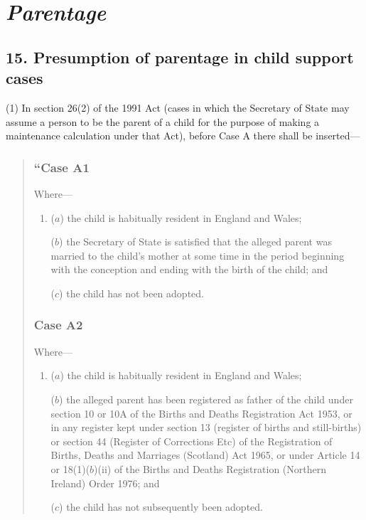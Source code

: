 \documentclass[12pt,a4paper]{article}
\begin{document}
\section{\itshape Parentage}

\subsection{15. Presumption of parentage in child support cases}

(1) In section 26(2)  of the 1991 Act (cases in which the Secretary of State may assume a person to be the parent of a child for the purpose of making a maintenance calculation under that Act), before Case A there shall be inserted—
\begin{quotation}
\subsubsection*{“Case A1}

Where—
\begin{enumerate}\item[]
($a$) the child is habitually resident in England and Wales;

($b$) the Secretary of State is satisfied that the alleged parent was married to the child’s mother at some time in the period beginning with the conception and ending with the birth of the child; and

($c$) the child has not been adopted.
\end{enumerate}

\subsubsection*{Case A2}

Where—
\begin{enumerate}\item[]
($a$) the child is habitually resident in England and Wales;

($b$) the alleged parent has been registered as father of the child under section 10 or 10A of the Births and Deaths Registration Act 1953, or in any register kept under section 13 (register of births and still-births) or section 44 (Register of Corrections Etc) of the Registration of Births, Deaths and Marriages (Scotland) Act 1965, or under Article 14 or 18(1)($b$)(ii)  of the Births and Deaths Registration (Northern Ireland) Order 1976; and

($c$) the child has not subsequently been adopted.
\end{enumerate}


\end{quotation}
\end{document}
